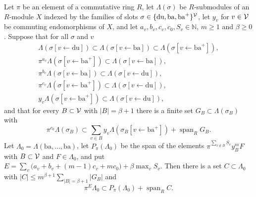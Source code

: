 \begin{proposition}\label{r2:walk}
Let $\pi$ be an element of a commutative ring $R$, let $\Lambda(\sigma)$ be $R$-submodules of an $R$-module $X$ indexed by the families of slots $\sigma\in\{\mathrm{du},\mathrm{ba},\mathrm{ba}^+\}^{\mathcal V}$, let $y_v$ for $v\in\mathcal V$ be commuting endomorphisms of $X$, and let $a_v,b_v,c_v,c_0,S_v\in\mathbb N$, $m\ge1$ and $\beta\ge0$. Suppose that for all $\sigma$ and $v$
\begin{gather*}
\Lambda(\sigma[v\leftarrow\mathrm{du}])\subset\Lambda(\sigma[v\leftarrow\mathrm{ba}])\subset\Lambda(\sigma[v\leftarrow\mathrm{ba}^+]),\\
\pi^{a_v}\Lambda(\sigma[v\leftarrow\mathrm{ba}^+])\subset\Lambda(\sigma[v\leftarrow\mathrm{ba}]),\\
\pi^{b_v}\Lambda(\sigma[v\leftarrow\mathrm{ba}])\subset\Lambda(\sigma[v\leftarrow\mathrm{du}]),\\
\pi^{c_v}\Lambda(\sigma[v\leftarrow\mathrm{ba}^+])\subset\Lambda(\sigma[v\leftarrow\mathrm{du}]),\\
y_v\Lambda(\sigma[v\leftarrow\mathrm{ba}^+])\subset\Lambda(\sigma[v\leftarrow\mathrm{du}]),
\end{gather*}
and that for every $B\subset\mathcal V$ with $\lvert B\rvert=\beta+1$ there is a finite set $G_B\subset\Lambda(\sigma_B)$ with
\[
\pi^{c_0}\Lambda(\sigma_B)\subset\sum_{v\in B}y_v\Lambda(\sigma_B[v\leftarrow\mathrm{ba}^+])+\operatorname{span}_RG_B .
\]
Let $\Lambda_0=\Lambda(\mathrm{ba},\dots,\mathrm{ba})$, let $P_\pi(\Lambda_0)$ be the span of the elements $\pi^{\sum_{v\notin B}S_v}y_B^mF$ with $B\subset\mathcal V$ and $F\in\Lambda_0$, and put $E=\sum_v\big(a_v+b_v+(m-1)c_v+mc_0\big)+\beta\max_vS_v$. Then there is a set $C\subset\Lambda_0$ with $\lvert C\rvert\le m^{\beta+1}\sum_{\lvert B\rvert=\beta+1}\lvert G_B\rvert$ and
\[
\pi^E\Lambda_0\subset P_\pi(\Lambda_0)+\operatorname{span}_RC .
\]
\end{proposition}

